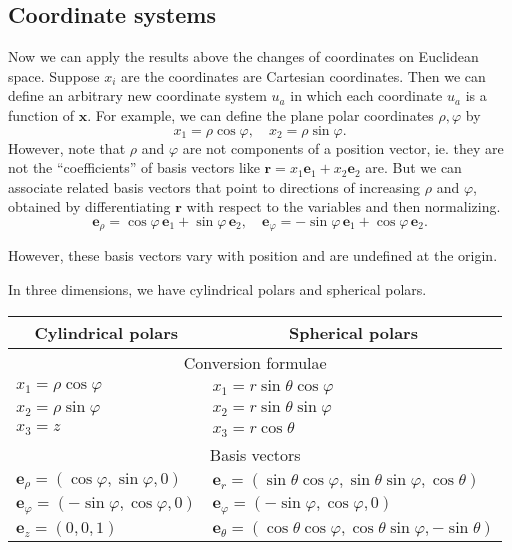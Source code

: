 \documentclass[a4paper]{article}
\begin{document}
\subsection{Coordinate systems}
Now we can apply the results above the changes of coordinates on Euclidean space. Suppose $x_i$ are the coordinates are Cartesian coordinates. Then we can define an arbitrary new coordinate system $u_a$ in which each coordinate $u_a$ is a function of $\mathbf{x}$. For example, we can define the plane polar coordinates $\rho, \varphi$ by
\[
  x_1 = \rho\cos\varphi, \quad x_2 = \rho\sin \varphi.
\]
However, note that $\rho$ and $\varphi$ are not components of a position vector, ie. they are not the ``coefficients'' of basis vectors like $\mathbf{r} = x_1\mathbf{e}_1 + x_2\mathbf{e}_2$ are. But we can associate related basis vectors that point to directions of increasing $\rho$ and $\varphi$, obtained by differentiating $\mathbf{r}$ with respect to the variables and then normalizing.
\[
  \mathbf{e}_\rho = \cos \varphi\, \mathbf{e}_1 + \sin \varphi\, \mathbf{e}_2,\quad \mathbf{e}_\varphi = -\sin \varphi\, \mathbf{e}_1 + \cos \varphi\, \mathbf{e}_2.
\]
\begin{center}
\end{center}
However, these basis vectors vary with position and are undefined at the origin.

In three dimensions, we have cylindrical polars and spherical polars.

\noindent\begin{tabularx}{\textwidth}{XX}
  \toprule
  \multicolumn{1}{c}{Cylindrical polars} & \multicolumn{1}{c}{Spherical polars}\\
  \midrule
  \multicolumn{2}{c}{Conversion formulae}\\
  \midrule
  $x_1 = \rho \cos \varphi$ & $x_1 = r\sin \theta\cos \varphi$\\
  $x_2 = \rho \sin \varphi$ & $x_2 = r\sin \theta \sin \varphi$\\
  $x_3 = z$ & $x_3 = r\cos\theta$\\
  \midrule
  \multicolumn{2}{c}{Basis vectors}\\
  \midrule
  $\mathbf{e}_\rho = (\cos\varphi, \sin \varphi, 0)$ & $\mathbf{e}_r = (\sin\theta\cos\varphi, \sin \theta\sin \varphi , \cos \theta)$\\
  $\mathbf{e}_\varphi = (-\sin \varphi, \cos \varphi, 0)$ & $\mathbf{e}_\varphi = (-\sin \varphi, \cos \varphi, 0)$\\
  $\mathbf{e}_z = (0, 0, 1)$ & $\mathbf{e}_\theta = (\cos \theta\cos \varphi, \cos\theta\sin\varphi, -\sin \theta)$\\
  \bottomrule
\end{tabularx}
\end{document}
